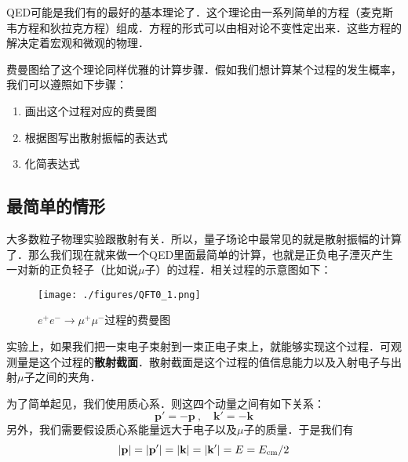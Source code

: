 

QED可能是我们有的最好的基本理论了．这个理论由一系列简单的方程（麦克斯韦方程和狄拉克方程）组成．方程的形式可以由相对论不变性定出来．这些方程的解决定着宏观和微观的物理．

费曼图给了这个理论同样优雅的计算步骤．假如我们想计算某个过程的发生概率，我们可以遵照如下步骤：

\begin{enumerate}
\item 画出这个过程对应的费曼图
\item 根据图写出散射振幅的表达式
\item 化简表达式
\end{enumerate}

\subsection{最简单的情形}
大多数粒子物理实验跟散射有关．所以，量子场论中最常见的就是散射振幅的计算了．那么我们现在就来做一个QED里面最简单的计算，也就是正负电子湮灭产生一对新的正负轻子（比如说$\mu$子）的过程．相关过程的示意图如下：

\begin{figure}[ht]
\centering
\texttt{[image: ./figures/QFT0\_1.png]}
\caption{$e^+e^-\rightarrow\mu^+\mu^-$过程的费曼图} \label{QFT0_fig1}
\end{figure}

实验上，如果我们把一束电子束射到一束正电子束上，就能够实现这个过程．可观测量是这个过程的\textbf{散射截面}．散射截面是这个过程的值信息能力以及入射电子与出射$\mu$子之间的夹角．

为了简单起见，我们使用质心系．则这四个动量之间有如下关系：
\begin{equation}
\mathbf p' = - \mathbf p~, \quad \mathbf k'=-\mathbf k
\end{equation}
另外，我们需要假设质心系能量远大于电子以及$\mu$子的质量．于是我们有
\begin{equation}
|\mathbf p| = |\mathbf p'| = |\mathbf k| = |\mathbf k'| = E = E_{\rm cm}/2
\end{equation}

















